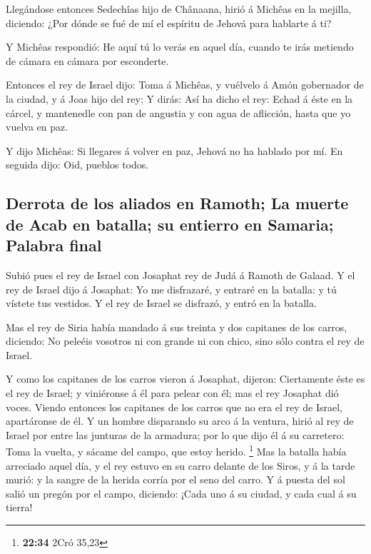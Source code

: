  Llegándose entonces Sedechîas hijo de Chânaana, hirió á
Michêas en la mejilla, diciendo: ¿Por dónde se fué de mí el espíritu de
Jehová para hablarte á ti?

 Y Michêas respondió: He aquí tú lo verás en aquel día,
cuando te irás metiendo de cámara en cámara por esconderte.

 Entonces el rey de Israel dijo: Toma á Michêas, y
vuélvelo á Amón gobernador de la ciudad, y á Joas hijo del rey;
 Y dirás: Así ha dicho el rey: Echad á éste en la cárcel,
y mantenedle con pan de angustia y con agua de aflicción, hasta que yo
vuelva en paz.

 Y dijo Michêas: Si llegares á volver en paz, Jehová no
ha hablado por mí. En seguida dijo: Oid, pueblos todos.

\hypertarget{derrota-de-los-aliados-en-ramoth-la-muerte-de-acab-en-batalla-su-entierro-en-samaria-palabra-final}{%
\subsection{Derrota de los aliados en Ramoth; La muerte de Acab en
batalla; su entierro en Samaria; Palabra
final}\label{derrota-de-los-aliados-en-ramoth-la-muerte-de-acab-en-batalla-su-entierro-en-samaria-palabra-final}}

 Subió pues el rey de Israel con Josaphat rey de Judá á
Ramoth de Galaad.  Y el rey de Israel dijo á Josaphat: Yo
me disfrazaré, y entraré en la batalla: y tú vístete tus vestidos. Y el
rey de Israel se disfrazó, y entró en la batalla.

 Mas el rey de Siria había mandado á sus treinta y dos
capitanes de los carros, diciendo: No peleéis vosotros ni con grande ni
con chico, sino sólo contra el rey de Israel.

 Y como los capitanes de los carros vieron á Josaphat,
dijeron: Ciertamente éste es el rey de Israel; y viniéronse á él para
pelear con él; mas el rey Josaphat dió voces.  Viendo
entonces los capitanes de los carros que no era el rey de Israel,
apartáronse de él.  Y un hombre disparando su arco á la
ventura, hirió al rey de Israel por entre las junturas de la armadura;
por lo que dijo él á su carretero: Toma la vuelta, y sácame del campo,
que estoy herido. \footnote{\textbf{22:34} 2Cró 35,23} 
Mas la batalla había arreciado aquel día, y el rey estuvo en su carro
delante de los Siros, y á la tarde murió: y la sangre de la herida
corría por el seno del carro.  Y á puesta del sol salió
un pregón por el campo, diciendo: ¡Cada uno á su ciudad, y cada cual á
su tierra!

